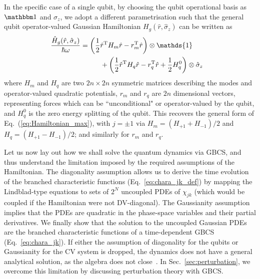 \documentclass[%
reprint,
superscriptaddress,
nofootinbib,
 amsmath,amssymb,
prx,
floatfix,
]{revtex4-2}
\begin{document}
In the specific case of a single qubit, by choosing the qubit operational basis as ${\mathbbm 1}$ and $\sigma_z$, we adopt a different parametrisation such that the general qubit operator-valued Gaussian Hamiltonian $H_g (\hat{r}, \hat{\sigma}_z)$ can be written as
\begin{align}
\label{eq:Hamiltonian_max_qubit}
    \hspace{-0.3cm}\frac{\hat{H}_g (\hat{r}, \hat{\sigma}_z)}{\hbar \omega} &=  \left(  \frac{1}{2} \hat{r}^{\rm T} H_m \hat{r} - r_m^{\rm T} \hat{r}  \right) \otimes \mathds{1}\nonumber \\
    &\hspace{1cm} + \left( \frac{1}{2} \hat{r}^{\rm T} H_q \hat{r} - r_q^{\rm T} \hat{r} + \frac{1}{2} H_q^0 \right) \otimes \hat{\sigma}_z
\end{align}
where $H_m$ and $H_q$ are two $2 n \times 2n $ symmetric matrices describing the modes and operator-valued quadratic potentials, $r_m$ and $r_q$ are $2n$ dimensional vectors, representing forces which can be ``unconditional" or operator-valued by the qubit, and $H_q^0$ is the zero energy splitting of the qubit. This recovers the general form of Eq.~(\ref{eq:Hamiltonian_max}), with $j = \pm 1$ via $H_m  = (H_{+ 1} + H_{-1})/ 2$ and $ H_q  = (H_{+ 1} - H_{-1})/ 2$; and similarly for $r_m$ and $r_q $. 

Let us now lay out how we shall solve the quantum dynamics via GBCS, and thus understand the limitation imposed by  the required assumptions of the Hamiltonian. The diagonality assumption allows us to derive the time evolution of the branched characteristic functions (Eq.~\ref{eq:chara_jk_def}) by mapping the Lindblad-type equations to sets of $2^N$ uncoupled PDEs of $\chi_{jk}$ (which would be coupled if the Hamiltonian were not DV-diagonal). The Gaussianity assumption implies that the PDEs are quadratic in the phase-space variables and their partial derivatives. We finally show that the solution to the uncoupled Gaussian PDEs are the branched characteristic functions of a time-dependent GBCS (Eq.~\ref{eq:chara_jk}).  If either the assumption of diagonality for the qubits or Gaussianity for the CV system is dropped, the dynamics does not have a general analytical solution, as the algebra does not close~\cite{wei_james_1963,legget_dynamics_1987,circuit_niemczyk_2010,superconducting_yoshihara_2017,ralph_dynamical_2018,roda_macroscopic_2024}. In Sec.~\ref{sec:perturbation}, we overcome this limitation by discussing perturbation theory with GBCS.
\end{document}

